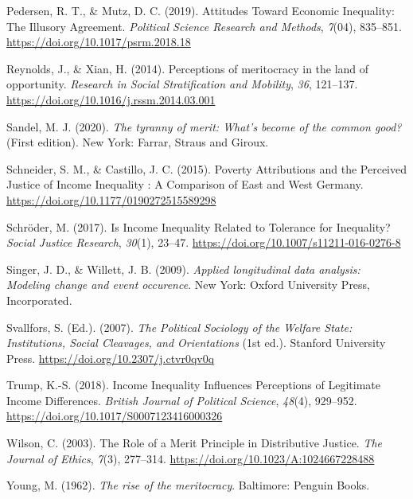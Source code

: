 \documentclass[
  12pt,
]{article}
\newlength{\cslhangindent}
\newenvironment{CSLReferences}[2] %
 {\begin{list}{}{%
  \setlength{\itemindent}{0pt}
  \setlength{\leftmargin}{0pt}
  \setlength{\parsep}{0pt}
  \ifodd #1
   \setlength{\leftmargin}{\cslhangindent}
   \setlength{\itemindent}{-1\cslhangindent}
  \fi
  \setlength{\itemsep}{#2\baselineskip}}}
 {\end{list}}
\begin{document}
\begin{CSLReferences}{1}{0}
Pedersen, R. T., \& Mutz, D. C. (2019). Attitudes {Toward Economic
Inequality}: {The Illusory Agreement}. \emph{Political Science Research
and Methods}, \emph{7}(04), 835--851.
\url{https://doi.org/10.1017/psrm.2018.18}

Reynolds, J., \& Xian, H. (2014). Perceptions of meritocracy in the land
of opportunity. \emph{Research in Social Stratification and Mobility},
\emph{36}, 121--137. \url{https://doi.org/10.1016/j.rssm.2014.03.001}

Sandel, M. J. (2020). \emph{The tyranny of merit: {What}'s become of the
common good?} (First edition). New York: {Farrar, Straus and Giroux}.

Schneider, S. M., \& Castillo, J. C. (2015). Poverty {Attributions} and
the {Perceived Justice} of {Income Inequality} : {A Comparison} of
{East} and {West Germany}.
\url{https://doi.org/10.1177/0190272515589298}

Schröder, M. (2017). Is {Income Inequality Related} to {Tolerance} for
{Inequality}? \emph{Social Justice Research}, \emph{30}(1), 23--47.
\url{https://doi.org/10.1007/s11211-016-0276-8}

Singer, J. D., \& Willett, J. B. (2009). \emph{Applied longitudinal data
analysis: Modeling change and event occurence}. New York: Oxford
University Press, Incorporated.

Svallfors, S. (Ed.). (2007). \emph{The {Political Sociology} of the
{Welfare State}: {Institutions}, {Social Cleavages}, and {Orientations}}
(1st ed.). Stanford University Press.
\url{https://doi.org/10.2307/j.ctvr0qv0q}

Trump, K.-S. (2018). Income {Inequality Influences Perceptions} of
{Legitimate Income Differences}. \emph{British Journal of Political
Science}, \emph{48}(4), 929--952.
\url{https://doi.org/10.1017/S0007123416000326}

Wilson, C. (2003). The {Role} of a {Merit Principle} in {Distributive
Justice}. \emph{The Journal of Ethics}, \emph{7}(3), 277--314.
\url{https://doi.org/10.1023/A:1024667228488}

Young, M. (1962). \emph{The rise of the meritocracy}. Baltimore: Penguin
Books.

\end{CSLReferences}
\end{document}
